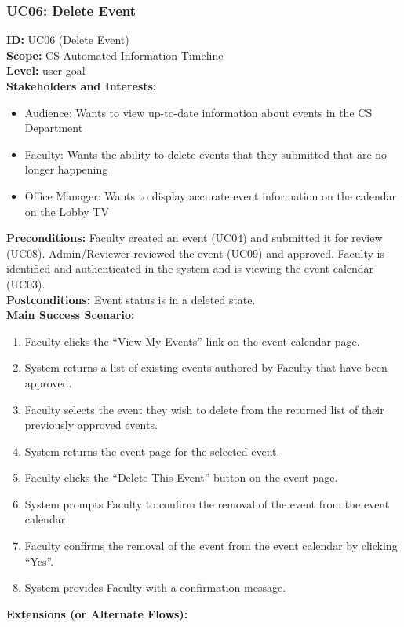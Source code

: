 \documentclass{article}
\begin{document}
\subsubsection{UC06: Delete Event}
\textbf{ID:} UC06 (Delete Event) \\
\textbf{Scope:} CS Automated Information Timeline \\
\textbf{Level:} user goal \\
\textbf{Stakeholders and Interests:}
\begin{itemize}
    \item Audience: Wants to view up-to-date information about events in the CS Department
    \item Faculty: Wants the ability to delete events that they submitted that are no longer happening
    \item Office Manager: Wants to display accurate event information on the calendar on the Lobby TV
\end{itemize}
\textbf{Preconditions:} Faculty created an event (UC04) and submitted it for review (UC08). Admin/Reviewer reviewed the event (UC09) and approved. Faculty is identified and authenticated in the system and is viewing the event calendar (UC03). \\
\textbf{Postconditions:} Event status is in a deleted state. \\
\textbf{Main Success Scenario:}
\begin{enumerate}
    \item Faculty clicks the ``View My Events'' link on the event calendar page.
    \item System returns a list of existing events authored by Faculty that have been approved.
    \item Faculty selects the event they wish to delete from the returned list of their previously approved events.
    \item System returns the event page for the selected event.
    \item Faculty clicks the ``Delete This Event'' button on the event page.
    \item System prompts Faculty to confirm the removal of the event from the event calendar.
    \item Faculty confirms the removal of the event from the event calendar by clicking ``Yes''.
    \item System provides Faculty with a confirmation message.
\end{enumerate}
\textbf{Extensions (or Alternate Flows):} \\
\end{document}

